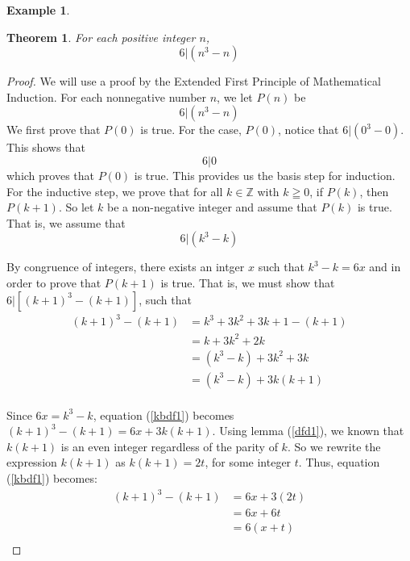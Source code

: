 \documentclass{book}
\newtheorem{theorem}{Theorem}[section]
\theoremstyle{definition}
\newtheorem{example}{Example}[definition]
\theoremstyle{remark}
\newcommand{\bb}[1]{\mathbb{#1}}
\begin{document}
\begin{example}
\begin{tcolorbox}
    \begin{theorem}
        For each positive integer $n$,
            \begin{equation*}
                6 | (n^3 - n)
            \end{equation*}
    \end{theorem}
\end{tcolorbox}


\begin{proof}
    We will use a proof by the Extended First Principle of Mathematical Induction. For each nonnegative number $n$, we let $P(n)$ be
        \begin{equation*}
            6 | (n^3 - n)
        \end{equation*}
    We first prove that $P(0)$ is true. For the case, $P(0)$, notice that $ 6 | (0^3 - 0)$. This shows that   
        \begin{equation*}
            6 | 0
        \end{equation*}
    which proves that $P(0)$ is true. This provides us the basis step for induction. \\ 
    
    For the inductive step, we prove that for all $k \in \bb{Z}$ with $k \geqq 0$, if $P(k)$, then $P(k+1)$. So let $k$ be a non-negative integer and assume that $P(k)$ is true. That is, we assume that 
        \begin{equation*}
           6 | (k^3 - k)
        \end{equation*}
    
    By congruence of integers, there exists an intger $x$ such that $k^3 - k = 6x $ and in order to prove that $P(k+1)$ is true. That is, we must show that $6 | [(k+1)^3 - (k+1)]$, such that
        \begin{align}
        \label{kbdf1}
            (k+1)^3 - (k+1) & = k^3 + 3k^2 + 3k + 1 - (k+1) \nonumber \\
                    & = k + 3k^2 + 2k \nonumber \\
                    & = (k^3 - k) + 3k^2 + 3k \nonumber \\
                    & = (k^3 - k) + 3k(k+1) \nonumber \\
        \end{align}    
    
    Since $6x = k^3 - k$, equation (\ref{kbdf1}) becomes $(k+1)^3 - (k+1) = 6x + 3k(k+1)$. Using lemma (\ref{dfd1}), we known that $k(k+1)$ is an even integer regardless of the parity of $k$. So we rewrite the expression $k(k+1)$ as $k(k+1) = 2t$, for some integer $t$. Thus, equation (\ref{kbdf1}) becomes: 
        \begin{align}
        \label{kbdf2}        
            (k+1)^3 - (k+1) & = 6x + 3(2t) \nonumber \\
                & = 6x + 6t \nonumber \\
                & = 6(x + t) \nonumber \\
        \end{align}     
    

\end{proof}
\end{example}
\end{document}
